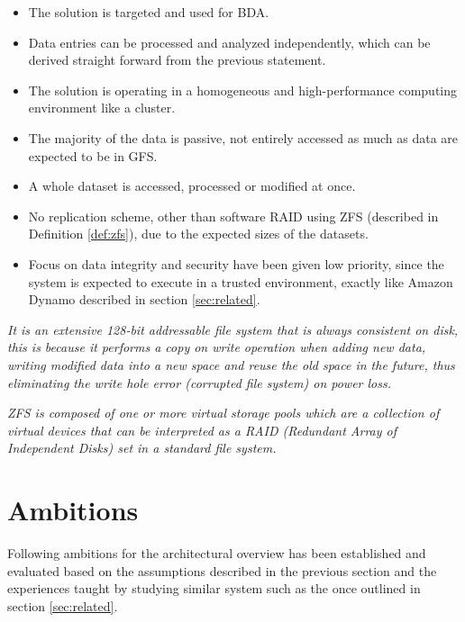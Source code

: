 \vspace*{2mm}
\begin{itemize}
	\item The solution is targeted and used for BDA.
	\item Data entries can be processed and analyzed independently, which can be derived straight forward from the previous statement.
	\item The solution is operating in a homogeneous and high-performance computing environment like a cluster.
	\item The majority of the data is passive, \eg not entirely accessed as much as data are expected to be in GFS.
	\item A whole dataset is accessed, processed or modified at once.
	\item No replication scheme, other than \eg software RAID using ZFS (described in Definition \ref{def:zfs}), due to the expected sizes of the datasets.
	\item Focus on data integrity and security have been given low priority, since the system is expected to execute in a trusted environment, exactly like Amazon Dynamo described in section \ref{sec:related}.
\end{itemize}
\vspace*{3mm}

\begin{definition}[ZFS] \label{def:zfs}
\textit{It is an extensive 128-bit addressable file system that is always consistent on disk, this is because it performs a copy on write operation when adding new data, \ie writing modified data into a new space and reuse the old space in the future, thus eliminating the write hole error (corrupted file system) \eg on power loss.}
\newline

\textit{ZFS is composed of one or more virtual storage pools which are a collection of virtual devices that can be interpreted as a RAID (Redundant Array of Independent Disks) set in a standard file system.}
\end{definition}

\section{Ambitions} \label{sec:ambitions}
Following ambitions for the architectural overview has been established and evaluated based on the assumptions described in the previous section and the experiences taught by studying similar system such as the once outlined in section \ref{sec:related}.

